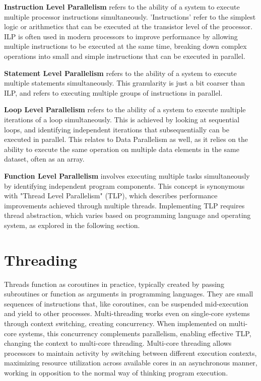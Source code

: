\documentclass[12pt,a4paper]{article}
\begin{document}
\textbf{Instruction Level Parallelism} refers to the ability of a system to execute multiple processor instructions simultaneously\parencite[pp. 115-116]{Rauber2023}. 'Instructions' refer to the simplest logic or arithmetics that can be executed at the transistor level of the processor. ILP is often used in modern processors to improve performance by allowing multiple instructions to be executed at the same time, breaking down complex operations into small and simple instructions that can be executed in parallel. 

\textbf{Statement Level Parallelism} refers to the ability of a system to execute multiple statements simultaneously\parencite[pp. 114]{Rauber2023}. This granularity is just a bit coarser than ILP, and refers to executing multiple groups of instructions in parallel.

\textbf{Loop Level Parallelism} refers to the ability of a system to execute multiple iterations of a loop simultaneously\parencite[pp. 118-121]{Rauber2023}. This is achieved by looking at sequential loops, and identifying independent iterations that subsequentially can be executed in parallel. This relates to Data Parallelism\parencite[pp. 116-118]{Rauber2023} as well, as it relies on the ability to execute the same operation on multiple data elements in the same dataset, often as an array. 

\textbf{Function Level Parallelism} involves executing multiple tasks simultaneously by identifying independent program components\parencite[pp. 114, 121-122]{Rauber2023}. This concept is synonymous with "Thread Level Parallelism" (TLP)\parencite[pp. 27-36]{Rauber2023}, which describes performance improvements achieved through multiple threads. Implementing TLP requires thread abstraction, which varies based on programming language and operating system, as explored in the following section.

\section{Threading}

Threads function as coroutines in practice, typically created by passing subroutines or function as arguments in programming languages. They are small sequences of instructions that, like coroutines, can be suspended mid-execution and yield to other processes. Multi-threading works even on single-core systems through context switching\parencite{Rauber2023}, creating concurrency. When implemented on multi-core systems, this concurrency complements parallelism, enabling effective TLP, changing the context to multi-core threading. Multi-core threading allows processors to maintain activity by switching between different execution contexts, maximizing resource utilization across available cores in an asynchronous manner, working in opposition to the normal way of thinking program execution\parencite{Rajsbaum2020}.
\end{document}
